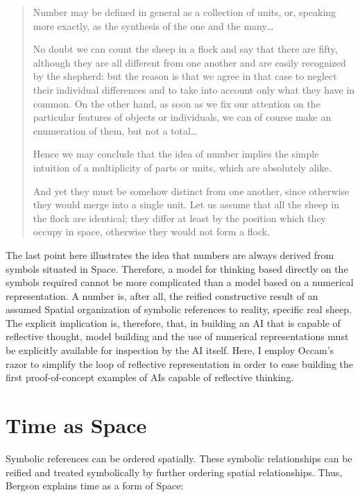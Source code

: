 \begin{quote}
Number may be defined in general as a collection of units, or,
speaking more exactly, as the synthesis of the one and the
many\ldots

No doubt we can count the sheep in a flock and say that there are
fifty, although they are all different from one another and are easily
recognized by the shepherd: but the reason is that we agree in that
case to neglect their individual differences and to take into account
only what they have in common.  On the other hand, as soon as we fix
our attention on the particular features of objects or individuals, we
can of course make an enumeration of them, but not a total\ldots

Hence we may conclude that the idea of number implies the simple
intuition of a multiplicity of parts or units, which are absolutely
alike.

And yet they must be somehow distinct from one another, since
otherwise they would merge into a single unit.  Let us assume that all
the sheep in the flock are identical; they differ at least by the
position which they occupy in space, otherwise they would not form a
flock.
\end{quote}

The last point here illustrates the idea that numbers are always
derived from symbols situated in Space.  Therefore, a model for
thinking based directly on the symbols required cannot be more
complicated than a model based on a numerical representation.  A
number is, after all, the reified constructive result of an assumed
Spatial organization of symbolic references to reality, specific real
sheep.  The explicit implication is, therefore, that, in building an
AI that is capable of reflective thought, model building and the use
of numerical representations must be explicitly available for
inspection by the AI itself.  Here, I employ Occam's razor to simplify
the loop of reflective representation in order to ease building the
first proof-of-concept examples of AIs capable of reflective thinking.

\section{Time as Space}

Symbolic references can be ordered spatially.  These symbolic
relationships can be reified and treated symbolically by further
ordering spatial relationships.  Thus, Bergson explains time as a form
of Space:

